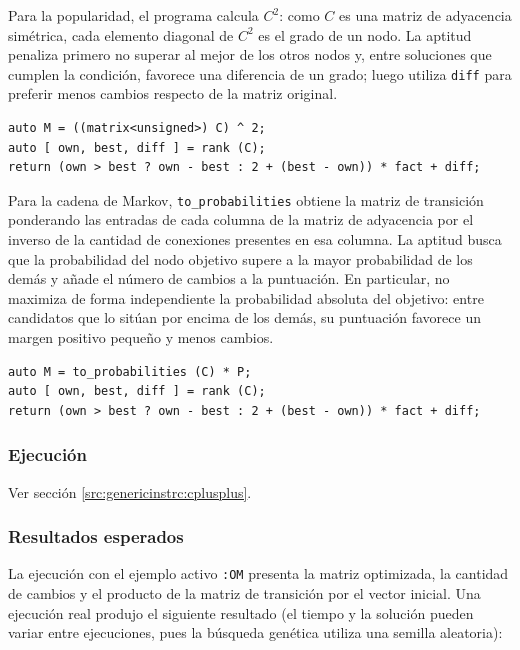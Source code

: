 \documentclass{article}[12pt,a4paper]
\begin{document}
Para la popularidad, el programa calcula \(C^2\): como \(C\) es una matriz de adyacencia simétrica, cada elemento diagonal de \(C^2\) es el grado de un nodo. La aptitud penaliza primero no superar al mejor de los otros nodos y, entre soluciones que cumplen la condición, favorece una diferencia de un grado; luego utiliza \texttt{diff} para preferir menos cambios respecto de la matriz original.

\begin{verbatim}
auto M = ((matrix<unsigned>) C) ^ 2;
auto [ own, best, diff ] = rank (C);
return (own > best ? own - best : 2 + (best - own)) * fact + diff;
\end{verbatim}

Para la cadena de Markov, \texttt{to_probabilities} obtiene la matriz de transición ponderando las entradas de cada columna de la matriz de adyacencia por el inverso de la cantidad de conexiones presentes en esa columna. La aptitud busca que la probabilidad del nodo objetivo supere a la mayor probabilidad de los demás y añade el número de cambios a la puntuación. En particular, no maximiza de forma independiente la probabilidad absoluta del objetivo: entre candidatos que lo sitúan por encima de los demás, su puntuación favorece un margen positivo pequeño y menos cambios.

\begin{verbatim}
auto M = to_probabilities (C) * P;
auto [ own, best, diff ] = rank (C);
return (own > best ? own - best : 2 + (best - own)) * fact + diff;
\end{verbatim}

\subsubsection{Ejecución}

Ver sección \ref{src:genericinstrc:cplusplus}.

\subsubsection{Resultados esperados}

La ejecución con el ejemplo activo \texttt{:OM} presenta la matriz optimizada, la cantidad de cambios y el producto de la matriz de transición por el vector inicial. Una ejecución real produjo el siguiente resultado (el tiempo y la solución pueden variar entre ejecuciones, pues la búsqueda genética utiliza una semilla aleatoria):
\end{document}
